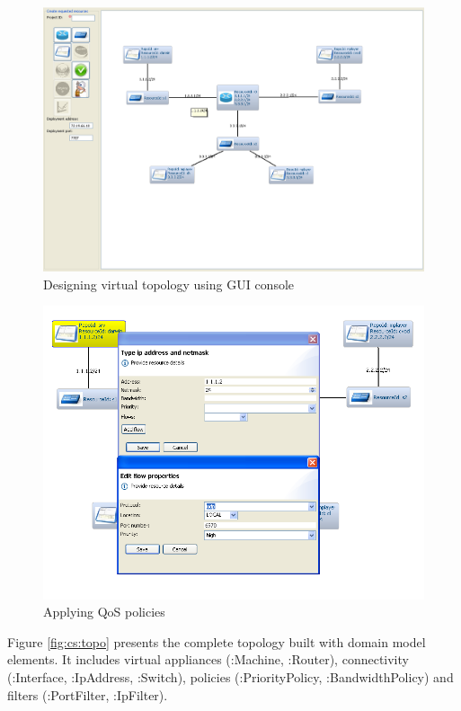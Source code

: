 \documentclass[11pt,openany]{book}
\begin{document}
        \begin{figure}[H]
          \centering
          \includegraphics[width=.7\textwidth]{img/test-case/gui-design.png}

          \caption{Designing virtual topology using GUI console}
          \label{fig:cs:gui-design}
        \end{figure}

        \begin{figure}[H]
          \centering
          \includegraphics[width=.7\textwidth]{img/test-case/gui-qos.png}

          \caption{Applying QoS policies}
          \label{fig:cs:gui-design}
        \end{figure}

        Figure \ref{fig:cs:topo} presents the complete topology built with domain model elements. It includes virtual
        appliances (:Machine, :Router), connectivity (:Interface, :IpAddress, :Switch), policies (:PriorityPolicy,
        :BandwidthPolicy) and filters (:PortFilter, :IpFilter).
\end{document}
